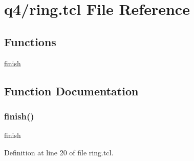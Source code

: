 \hypertarget{ring_8tcl}{}\section{q4/ring.tcl File Reference}
\label{ring_8tcl}
\subsection*{Functions}
\begin{DoxyCompactItemize}
\item 
\hyperlink{ring_8tcl_a30728837c246b65ef76298af0101d99c}{finish}
\end{DoxyCompactItemize}


\subsection{Function Documentation}
\mbox{\label{ring_8tcl_a30728837c246b65ef76298af0101d99c}} 
\subsubsection{\texorpdfstring{finish()}{finish()}}
{\footnotesize\ttfamily finish}



Definition at line 20 of file ring.\+tcl.

